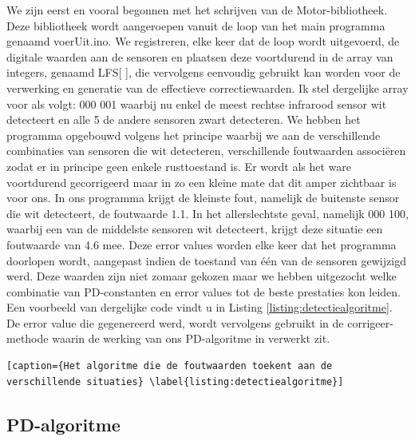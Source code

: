 We zijn eerst en vooral begonnen met het schrijven van de Motor-bibliotheek. Deze bibliotheek wordt aangeroepen vanuit de loop van het main programma genaamd voerUit.ino. We registreren, elke keer dat de loop wordt uitgevoerd, de digitale waarden aan de sensoren en plaatsen deze voortdurend in de array van integers, genaamd LFS[ ], die vervolgens eenvoudig gebruikt kan worden voor de verwerking en generatie van de effectieve correctiewaarden. Ik stel dergelijke array voor als volgt: 000 001 waarbij nu enkel de meest rechtse infrarood sensor wit detecteert en alle 5 de andere sensoren zwart detecteren. We hebben het programma opgebouwd volgens het principe waarbij we aan de verschillende combinaties van sensoren die wit detecteren, verschillende foutwaarden associ\"eren zodat er in principe geen enkele rusttoestand is. Er wordt als het ware voortdurend gecorrigeerd maar in zo een kleine mate dat dit amper zichtbaar is voor ons. In ons programma krijgt de kleinste fout, namelijk de buitenste sensor die wit detecteert, de foutwaarde 1.1. In het allerslechtste geval, namelijk 000 100, waarbij een van de middelste sensoren wit detecteert, krijgt deze situatie een foutwaarde van 4.6 mee. Deze error values worden elke keer dat het programma doorlopen wordt, aangepast indien de toestand van \'e\'en van de sensoren gewijzigd werd. Deze waarden zijn niet zomaar gekozen maar we hebben uitgezocht welke combinatie van PD-constanten en error values tot de beste prestaties kon leiden. Een voorbeeld van dergelijke code vindt u in Listing \ref{listing:detectiealgoritme}. De error value die gegenereerd werd, wordt vervolgens gebruikt in de corrigeer-methode waarin de werking van ons PD-algoritme in verwerkt zit.


\begin{lstlisting}[caption={Het algoritme die de foutwaarden toekent aan de verschillende situaties} \label{listing:detectiealgoritme}]
\end{lstlisting}

\subsection{PD-algoritme}

